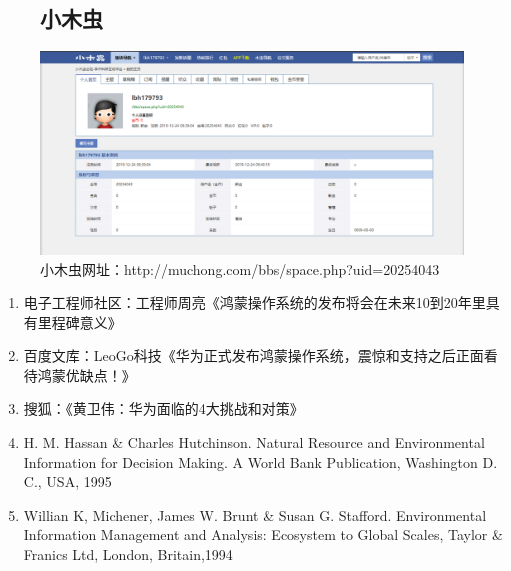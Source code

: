 \documentclass{article}
\begin{document}
\begin{itemize}
\begin{figure}[htb!]
\item\subsection{小木虫}
\centering
\includegraphics[scale=0.25]{xiaomuchong}
\caption{小木虫网址：http://muchong.com/bbs/space.php?uid=20254043}
\label{fig:xiaomuchong}
\end{figure}

\end{itemize}

\begin{enumerate}
    \item 电子工程师社区：工程师周亮《鸿蒙操作系统的发布将会在未来10到20年里具有里程碑意义》
    \item 百度文库：LeoGo科技《华为正式发布鸿蒙操作系统，震惊和支持之后正面看待鸿蒙优缺点！》
    \item 搜狐：《黄卫伟：华为面临的4大挑战和对策》 
    \item H. M. Hassan \& Charles Hutchinson. Natural Resource and Environmental Information for Decision Making. A World Bank Publication, Washington D. C., USA, 1995
    \item Willian K, Michener, James W. Brunt \& Susan G. Stafford. Environmental Information Management and Analysis: Ecosystem to Global Scales, Taylor \& Franics Ltd, London, Britain,1994
\end{enumerate}
\end{document}

